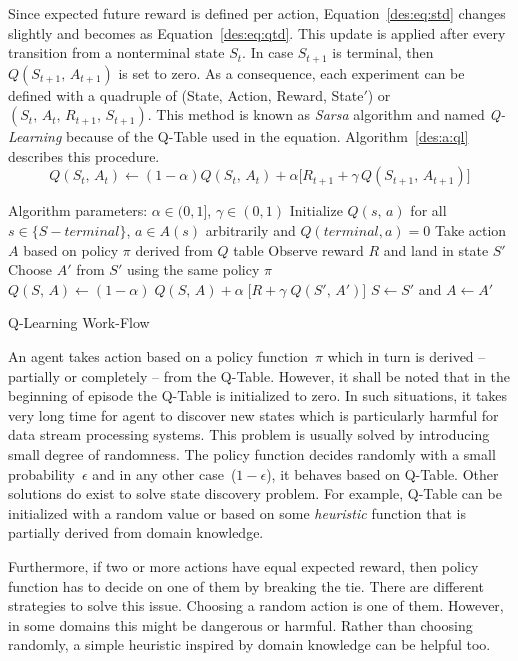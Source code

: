 Since expected future reward is defined per action, Equation~\ref{des:eq:std} changes slightly and becomes as Equation~\ref{des:eq:qtd}. This update is applied after every transition from a nonterminal state $S_t$. In case $S_{t+1}$ is terminal, then $Q(S_{t+1},\,A_{t+1})$ is set to zero. As a consequence, each experiment can be defined with a quadruple of (State, Action, Reward, State$'$) or $(S_{t},\,A_{t},\,R_{t+1},\,S_{t+1})$. This method is known as \emph{Sarsa} algorithm and named \emph{Q-Learning} because of the Q-Table used in the equation. Algorithm~\ref{des:a:ql} describes this procedure.
\begin{equation}
Q(S_t,\,A_t) \longleftarrow (1-\alpha)Q(S_t,\,A_t) + \alpha\big[R_{t+1} + \gamma\,Q(S_{t+1},\,A_{t+1})\big]
\label{des:eq:qtd}
\end{equation}
\begin{algorithm}[H]
	\DontPrintSemicolon
	Algorithm parameters: $\alpha \in (0,1]$, $\gamma \in (0,1)$\;
	Initialize $Q(s,\,a)$ for all $s \in \{S - terminal\}$, $a \in A(s)$ arbitrarily and $Q(terminal,a) = 0$\;
	 {
		Take action $A$ based on policy $\pi$ derived from $Q$ table\;
		Observe reward $R$ and land in state $S'$\;
		Choose $A'$ from $S'$ using the same policy $\pi$\;
		$Q(S,\,A) \gets (1-\alpha)\;Q(S,\,A) + \alpha\;\big[R + \gamma\;Q(S',\,A')\big]$\;
		$S \gets S'$ and $A \gets A'$\;
	}
	\caption[Q-Learning Work-Flow]{Q-Learning Work-Flow\footnotemark}
	\label{des:a:ql}
\end{algorithm}

An agent takes action based on a policy function~$\pi$ which in turn is derived -- partially or completely -- from the Q-Table. However, it shall be noted that in the beginning of episode the Q-Table is initialized to zero. In such situations, it takes very long time for agent to discover new states which is particularly harmful for data stream processing systems. This problem is usually solved by introducing small degree of randomness. The policy function decides randomly with a small probability~$\epsilon$ and in any other case~($1-\epsilon$), it behaves based on Q-Table. Other solutions do exist to solve state discovery problem. For example, Q-Table can be initialized with a random value or based on some \emph{heuristic} function that is partially derived from domain knowledge. 

Furthermore, if two or more actions have equal expected reward, then policy function has to decide on one of them by breaking the tie. There are different strategies to solve this issue. Choosing a random action is one of them. However, in some domains this might be dangerous or harmful. Rather than choosing randomly, a simple heuristic inspired by domain knowledge can be helpful too.
